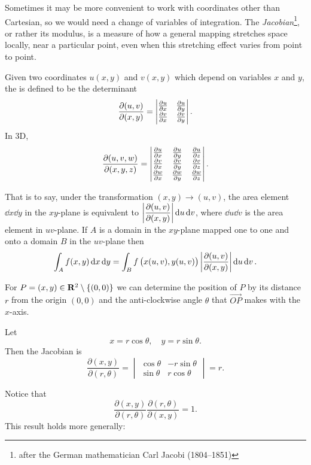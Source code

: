 Sometimes it may be more convenient to work with coordinates other than Cartesian, so we would need a change of variables of integration. 
The \emph{Jacobian}\footnote{after the German mathematician Carl Jacobi (1804--1851)}, or rather its modulus, is a measure of how a general mapping stretches space locally, near a particular point, even when this stretching effect varies from point to point.

\begin{definition}[Jacobian]
Given two coordinates $u(x,y)$ and $v(x,y)$ which depend on variables $x$ and $y$, the  is defined to be the determinant
\[\frac{\partial(u,v)}{\partial(x,y)}=\begin{vmatrix}
\pdv{u}{x}&\pdv{u}{y}\\
\pdv{v}{x}&\pdv{v}{y}
\end{vmatrix}.\]
In 3D,
\[\frac{\partial(u,v,w)}{\partial(x,y,z)}=\begin{vmatrix}
\pdv{u}{x}&\pdv{u}{y}&\pdv{u}{z}\\
\pdv{v}{x}&\pdv{v}{y}&\pdv{v}{z}\\
\pdv{w}{x}&\pdv{w}{y}&\pdv{w}{z}
\end{vmatrix}.\]
\end{definition}

That is to say, under the transformation $(x,y)\to(u,v)$, the area element $\dd{x}\dd{y}$ in the $xy$-plane is equivalent to $\displaystyle\left|\frac{\partial(u,v)}{\partial(x,y)}\right|\dd{u}\dd{v}$, where $\dd{u}\dd{v}$ is the area element in $uv$-plane. If $A$ is a domain in the $xy$-plane mapped one to one and onto a domain $B$ in the $uv$-plane then
\[\int_Af(x,y)\dd{x}\dd{y}=\int_Bf\left(x(u,v),y(u,v)\right)\left|\frac{\partial(u,v)}{\partial(x,y)}\right|\dd{u}\dd{v}.\]

\begin{example}
For $P=(x,y)\in\mathbf R^2\setminus\{(0,0)\}$ we can determine the position of $P$ by its distance $r$ from the origin $(0,0)$ and the anti-clockwise angle $\theta$ that $\overrightarrow{OP}$ makes with the $x$-axis.

Let
\[x=r\cos\theta,\quad y=r\sin\theta.\]
Then the Jacobian is
\[\frac{\partial(x,y)}{\partial(r,\theta)}=\begin{vmatrix}
\cos\theta&-r\sin\theta\\
\sin\theta&r\cos\theta
\end{vmatrix}=r.\]
\end{example}

Notice that
\[\frac{\partial(x,y)}{\partial(r,\theta)}\frac{\partial(r,\theta)}{\partial(x,y)}=1.\]
This result holds more generally:

